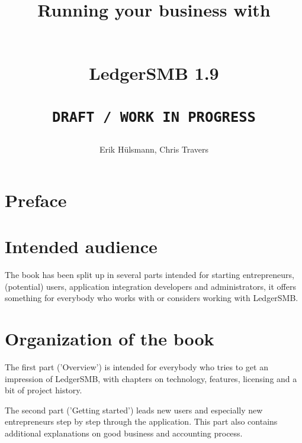 \documentclass[10pt,a4paper]{book}
\newcommand{\ledgerSMBversion}{1.9 }
\begin{document}




\author{Erik H\"ulsmann, Chris Travers}
\title{\begin{Large}
Running your business with
\end{Large} \\
LedgerSMB \ledgerSMBversion \\
 ~ \\
\texttt{DRAFT / WORK IN PROGRESS} }


\maketitle


\tableofcontents

\listoffigures

\listoftables

\printglossaries

\cleardoublepage

\section*{Preface}
\label{preface}

\section*{Intended audience}
\label{sec-intended-audience}

The book has been split up in several parts intended for starting entrepreneurs,
(potential) users, application integration developers and
administrators, it offers something for everybody who works with or considers working with
LedgerSMB.

\section*{Organization of the book}
\label{sec-book-organization}

The first
part ('Overview') is intended for everybody who tries to get an impression of LedgerSMB, with
chapters on technology, features, licensing and a bit of project history.

The second part
('Getting started') leads new users and especially new entrepreneurs step by step through the
application. This part also contains additional explanations on good business and accounting
process.
\end{document}
